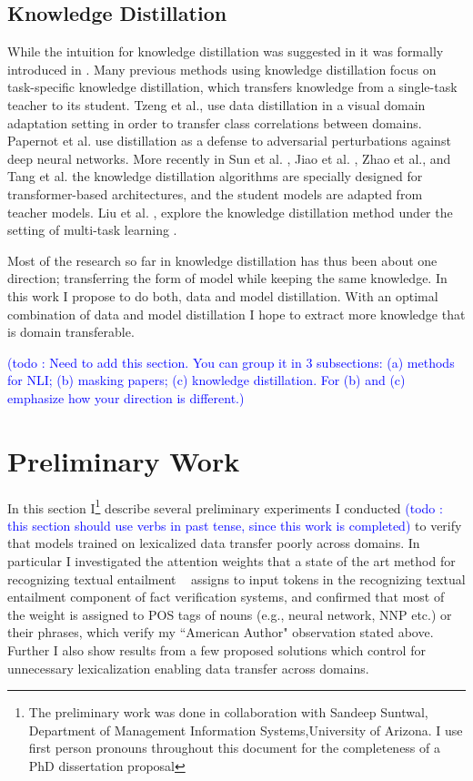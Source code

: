 \documentclass{article}
\newcommand\todo[1]{\textcolor{blue}{(todo : #1)}}
\begin{document}
\subsection{Knowledge Distillation}
While the intuition for knowledge distillation was suggested in \citep*{ba2014deep} it was formally introduced in \citep*{hinton2015distilling}. Many previous methods using knowledge distillation focus on task-specific knowledge distillation, which transfers knowledge from a single-task teacher to its student. Tzeng et al.\citep*{tzeng2015simultaneous}, use data distillation in a visual domain adaptation setting in order to transfer class correlations between domains. Papernot et al. \citep*{papernot2016distillation} use distillation as a defense to adversarial perturbations against deep neural networks. More recently in Sun et al. \citep*{sun2019patient} , Jiao et al. \citep*{jiao2019tinybert},  Zhao et al.\citep*{zhao2019extreme}, and Tang et al. \citep*{tang2019distilling} the knowledge distillation algorithms are specially designed for transformer-based architectures, and the student models are adapted from teacher models. Liu et al. \citep*{liu2019attentive}, explore the knowledge distillation method under the setting of multi-task learning \citep*{caruana1997multitask} \citep*{baxter2000model}.

Most of the research so far in knowledge distillation has thus been about one direction; transferring the form of model while keeping the same knowledge. In this work I propose to do both, data and model distillation. With an optimal combination of data and model distillation I hope to extract more knowledge that is domain transferable.


\todo{Need to add this section. You can group it in 3 subsections: (a) methods for NLI; (b) masking papers; (c) knowledge distillation. For (b) and (c) emphasize how your direction is different.}

\section{Preliminary Work}


In this section I\footnote{The preliminary work was done in collaboration with Sandeep Suntwal,  Department of Management Information Systems,University of Arizona. I use first person pronouns throughout this document for the completeness of a PhD dissertation proposal} describe several preliminary experiments I conducted \todo{this section should use verbs in past tense, since this work is completed} to verify that models trained on lexicalized data transfer poorly across domains. In particular I investigated the attention weights that a state of the art method for recognizing textual entailment ~\citep*{parikh2016decomposable} assigns to input tokens in the recognizing textual entailment component of fact verification systems, and confirmed that most of the weight is assigned to POS tags of nouns (e.g., neural network, NNP etc.) or their phrases, which verify my ``American Author" observation stated above. Further I also show results from a few proposed solutions which control for unnecessary lexicalization enabling data transfer across domains.
\end{document}
